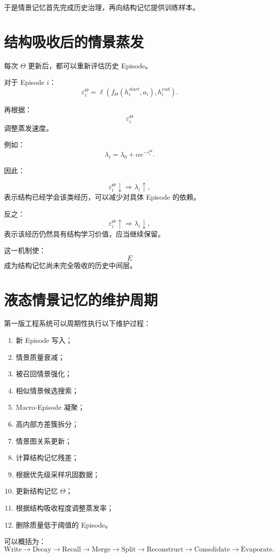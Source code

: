 于是情景记忆首先完成历史治理，再向结构记忆提供训练样本。

\section{结构吸收后的情景蒸发}

每次 $\Theta$ 更新后，都可以重新评估历史 Episode。

对于 Episode $i$：
\[
\varepsilon_i^\Theta
=
\ell
\left(
f_\Theta(h_i^{start},a_i),
h_i^{end}
\right).
\]

再根据：
\[
\varepsilon_i^\Theta
\]
调整蒸发速度。

例如：
\[
\lambda_i
=
\lambda_0
+
\alpha
e^{-\varepsilon_i^\Theta}.
\]

因此：

\[
\varepsilon_i^\Theta\downarrow
\Rightarrow
\lambda_i\uparrow,
\]
表示结构已经学会该类经历，可以减少对具体 Episode 的依赖。

反之：
\[
\varepsilon_i^\Theta\uparrow
\Rightarrow
\lambda_i\downarrow,
\]
表示该经历仍然具有结构学习价值，应当继续保留。

这一机制使：
\[
\boxed{
E
}
\]
成为结构记忆尚未完全吸收的历史中间层。

\section{液态情景记忆的维护周期}

第一版工程系统可以周期性执行以下维护过程：

\begin{enumerate}
    \item 新 Episode 写入；
    \item 情景质量衰减；
    \item 被召回情景强化；
    \item 相似情景候选搜索；
    \item Macro-Episode 凝聚；
    \item 高内部方差簇拆分；
    \item 情景图关系更新；
    \item 计算结构记忆残差；
    \item 根据优先级采样巩固数据；
    \item 更新结构记忆 $\Theta$；
    \item 根据结构吸收程度调整蒸发率；
    \item 删除质量低于阈值的 Episode。
\end{enumerate}

可以概括为：
\[
\boxed{
\mathrm{Write}
\rightarrow
\mathrm{Decay}
\rightarrow
\mathrm{Recall}
\rightarrow
\mathrm{Merge}
\rightarrow
\mathrm{Split}
\rightarrow
\mathrm{Reconstruct}
\rightarrow
\mathrm{Consolidate}
\rightarrow
\mathrm{Evaporate}.
}
\]

